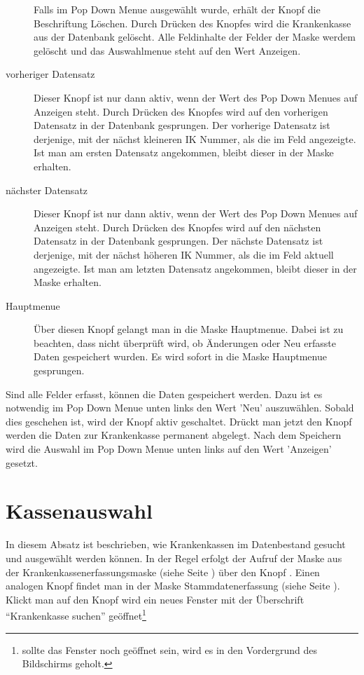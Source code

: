 \begin{description}
Falls im Pop Down Menue  ausgewählt wurde, erhält der Knopf die
Beschriftung Löschen. Durch Drücken des Knopfes wird die Krankenkasse aus der
Datenbank gelöscht. Alle Feldinhalte der Felder der Maske werdem gelöscht 
und das Auswahlmenue
steht auf den Wert Anzeigen. 
\item[vorheriger Datensatz] 
Dieser Knopf ist nur dann aktiv, wenn der Wert
des Pop Down Menues auf Anzeigen steht. Durch Drücken des Knopfes wird auf
den vorherigen Datensatz in der Datenbank gesprungen. Der vorherige Datensatz
ist derjenige, mit der nächst kleineren IK Nummer, als die im Feld 
 angezeigte. Ist
man am ersten Datensatz angekommen, bleibt dieser in der Maske erhalten.
\item[nächster Datensatz] 
Dieser Knopf ist nur dann aktiv, wenn der Wert
des Pop Down Menues auf Anzeigen steht. Durch Drücken des Knopfes wird auf
den nächsten Datensatz in der Datenbank gesprungen. Der nächste Datensatz
ist derjenige, mit der nächst höheren IK Nummer, als die im Feld 
 aktuell angezeigte. Ist
man am letzten Datensatz angekommen, bleibt dieser in der Maske erhalten.
\item[Hauptmenue] 
Über diesen Knopf gelangt man in die Maske Hauptmenue.
Dabei ist zu beachten, dass nicht überprüft wird, ob Änderungen oder Neu
erfasste Daten gespeichert wurden. Es wird sofort in die Maske Hauptmenue
gesprungen.
\end{description}

Sind alle Felder erfasst, können die Daten gespeichert werden. Dazu ist
es notwendig im Pop Down Menue unten links den Wert 'Neu' auszuwählen.
Sobald dies geschehen ist, wird der Knopf  aktiv 
geschaltet. Drückt man jetzt den Knopf  werden die Daten
zur Krankenkasse permanent abgelegt. Nach dem Speichern wird die Auswahl im 
Pop Down Menue unten links auf den Wert 'Anzeigen' gesetzt.




\section{Kassenauswahl}\label{kassenauswahl:abs}
In diesem Absatz ist beschrieben, wie Krankenkassen im Datenbestand gesucht und
ausgewählt werden können.
In der Regel erfolgt der  Aufruf der Maske aus der 
Krankenkassenerfassungsmaske (siehe
Seite \pageref{krankenkassenerfassung:fig}) 
über den Knopf . Einen analogen Knopf findet man in der Maske 
Stammdatenerfassung (siehe Seite \pageref{stammdatenerfassung:fig}).
Klickt man auf den Knopf  wird ein neues Fenster mit der
Überschrift ``Krankenkasse suchen'' geöffnet\footnote{sollte das Fenster noch geöffnet sein, wird es in den Vordergrund des Bildschirms geholt.}

